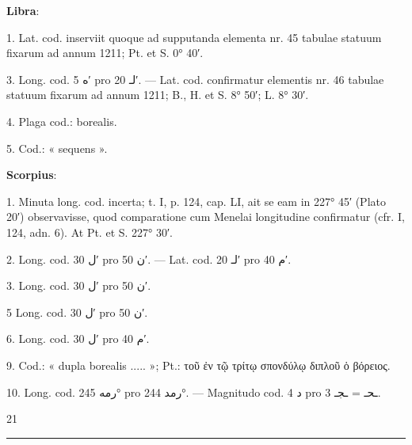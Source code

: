 \documentclass[11pt]{article}
\begin{document}
{\small
\par\hspace*{8mm}\textbf{Libra}:
\par\hangindent=12mm 1. Lat. cod. inserviit quoque ad supputanda elementa nr. 45 tabulae statuum fixarum ad annum 1211; Pt. et S. 0° 40′.
\par\hangindent=12mm 3. Long. cod. \textarabic{ه} 5′ pro \textarabic{لـ} 20′. — Lat. cod. confirmatur elementis nr. 46 tabulae statuum fixarum ad annum 1211; B., H. et S. 8° 50′; L. 8° 30′.
\par\hangindent=12mm 4. Plaga cod.: borealis.
\par\hangindent=12mm 5. Cod.: « sequens ».
\par\hspace*{8mm}\textbf{Scorpius}:
\par\hangindent=12mm 1. Minuta long. cod. incerta; t. I, p. 124, cap. LI, ait se eam in 227° 45′ (Plato 20′) observavisse, quod comparatione cum Menelai longitudine confirmatur (cfr. I, 124, adn. 6). At Pt. et S. 227° 30′.
\par\hangindent=12mm 2. Long. cod. \textarabic{ل} 30′ pro \textarabic{ن} 50′. — Lat. cod. \textarabic{لـ} 20′ pro \textarabic{م} 40′.
\par\hangindent=12mm 3. Long. cod. \textarabic{ل} 30′ pro \textarabic{ن} 50′.
\par\hangindent=12mm 5 Long. cod. \textarabic{ل} 30′ pro \textarabic{ن} 50′.
\par\hangindent=12mm 6. Long. cod. \textarabic{ل} 30′ pro \textarabic{م} 40′.
\par\hangindent=12mm 9. Cod.: « dupla borealis ..... »; Pt.: τοῦ ἐν τῷ τρίτῳ σπονδύλῳ διπλοῦ ὁ βόρειος.
\par\hangindent=12mm 10. Long. cod. \textarabic{رمه} 245° pro \textarabic{رمد} 244°. — Magnitudo cod. \textarabic{د} 4 pro \textarabic{ـحـ} = \textarabic{ـجـ} 3.
\par}
\par\vfill\hfill 21
\clearpage
\noindent{}\par\vspace{-1mm}\noindent\rule{\textwidth}{.4pt}\par\vspace{2mm}
\end{document}
